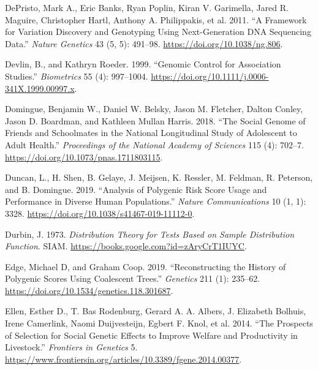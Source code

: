 \documentclass[
]{book}
\newlength{\cslhangindent}
\newlength{\cslentryspacingunit} %
\newenvironment{CSLReferences}[2] %
 {%
  \setlength{\parindent}{0pt}
  \ifodd #1
  \let\oldpar\par
  \def\par{\hangindent=\cslhangindent\oldpar}
  \fi
  \setlength{\parskip}{#2\cslentryspacingunit}
 }%
 {}
\begin{document}
\begin{CSLReferences}{1}{0}
\leavevmode{}%
DePristo, Mark A., Eric Banks, Ryan Poplin, Kiran V. Garimella, Jared R. Maguire, Christopher Hartl, Anthony A. Philippakis, et al. 2011. {``A Framework for Variation Discovery and Genotyping Using Next-Generation {DNA} Sequencing Data.''} \emph{Nature Genetics} 43 (5, 5): 491--98. \url{https://doi.org/10.1038/ng.806}.

\leavevmode{}%
Devlin, B., and Kathryn Roeder. 1999. {``Genomic {Control} for {Association Studies}.''} \emph{Biometrics} 55 (4): 997--1004. \url{https://doi.org/10.1111/j.0006-341X.1999.00997.x}.

\leavevmode{}%
Domingue, Benjamin W., Daniel W. Belsky, Jason M. Fletcher, Dalton Conley, Jason D. Boardman, and Kathleen Mullan Harris. 2018. {``The Social Genome of Friends and Schoolmates in the {National Longitudinal Study} of {Adolescent} to {Adult Health}.''} \emph{Proceedings of the National Academy of Sciences} 115 (4): 702--7. \url{https://doi.org/10.1073/pnas.1711803115}.

\leavevmode{}%
Duncan, L., H. Shen, B. Gelaye, J. Meijsen, K. Ressler, M. Feldman, R. Peterson, and B. Domingue. 2019. {``Analysis of Polygenic Risk Score Usage and Performance in Diverse Human Populations.''} \emph{Nature Communications} 10 (1, 1): 3328. \url{https://doi.org/10.1038/s41467-019-11112-0}.

\leavevmode{}%
Durbin, J. 1973. \emph{Distribution {Theory} for {Tests Based} on {Sample Distribution Function}}. {SIAM}. \url{https://books.google.com?id=zAryCrT1IUYC}.

\leavevmode{}%
Edge, Michael D, and Graham Coop. 2019. {``Reconstructing the {History} of {Polygenic Scores Using Coalescent Trees}.''} \emph{Genetics} 211 (1): 235--62. \url{https://doi.org/10.1534/genetics.118.301687}.

\leavevmode{}%
Ellen, Esther D., T. Bas Rodenburg, Gerard A. A. Albers, J. Elizabeth Bolhuis, Irene Camerlink, Naomi Duijvesteijn, Egbert F. Knol, et al. 2014. {``The Prospects of Selection for Social Genetic Effects to Improve Welfare and Productivity in Livestock.''} \emph{Frontiers in Genetics} 5. \url{https://www.frontiersin.org/articles/10.3389/fgene.2014.00377}.


\end{CSLReferences}
\end{document}
